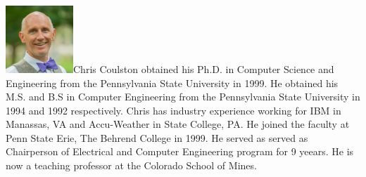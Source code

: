 \includegraphics[width=1in]{./Fig/Coulston.jpg}Chris
Coulston obtained his Ph.D. in Computer Science and Engineering from the
Pennsylvania State University in 1999. He obtained his M.S. and B.S in
Computer Engineering from the Pennsylvania State University in 1994 and
1992 respectively. Chris has industry experience working for IBM in
Manassas, VA and Accu-Weather in State College, PA. He joined the
faculty at Penn State Erie, The Behrend College in 1999.  He served as 
served as Chairperson of Electrical and Computer Engineering program
for 9 yeears.  He is now a teaching professor at the Colorado School of Mines.
